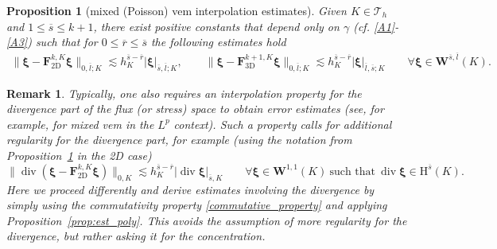 \documentclass[fleqn,a4paper]{cas-sc}
\newcommand\vdiv{\mathop{\mathrm{div}}\nolimits}
\newcommand\bdiv{\mathop{\mathbf{div}}\nolimits}
\newcommand{\bF}{\mathbf{F}}
\newcommand{\bxi}{\boldsymbol{\xi}}
\newcommand{\0}{\boldsymbol{0}}
\newcommand\cT{\mathcal{T}}
\newcommand{\bW}{\mathbf{W}}
\newcommand\rH{\mathrm{H}}
\newcommand\bH{\mathbf{H}}
\numberwithin{equation}{section}
\numberwithin{figure}{section}
\newtheorem{remark}{Remark}[section]
\newtheorem{proposition}[theorem]{Proposition}
\begin{document}
\begin{proposition}[mixed (Poisson) \gls{vem} interpolation estimates] \label{prop:est_int_mixed}
    {Given $K\in \cT_h$ 
    and $1 \leq {\overline{s}} \leq k+1$, there exist positive constants that depend} only on {$\gamma$} ({cf.} \ref{A1}-\ref{A3}) such that for $0\leq \overline{r}\leq {\overline{s}}$ the following estimates hold
    \begin{gather*}
       \|\bxi - \bF_{\mathrm{2D}}^{k,K}\bxi\|_{0,\overline{l};K} \lesssim h_K^{{\overline{s}}-\overline{r}}|\bxi|_{{\overline{s}},\overline{l};K},\qquad \|\bxi - \bF_{\mathrm{3D}}^{k+1,K}\bxi\|_{0,\overline{l};K} \lesssim h_K^{{\overline{s}}-\overline{r}}|\bxi|_{\overline{l},\overline{s};K} \qquad \forall \bxi \in \bW^{\overline{s},\overline{l}}(K).
    \end{gather*}
\end{proposition}
\begin{remark}
 Typically, one also requires an interpolation property for the divergence part of the flux (or stress) space to obtain error estimates (see, for example, \cite{gatica2021p,gharibi2025mixed,gharibi2025stabfree} for mixed \gls{vem} in the $L^p$ context). Such a property calls for additional regularity for the divergence part, for example (using the notation from Proposition~\ref{prop:est_int_mixed} in the 2D case)
\[\|\vdiv(\bxi - \bF_{\mathrm{2D}}^{k,K}\bxi)\|_{0,K} \lesssim h_K^{{\overline{s}}-\overline{r}} |\vdiv\bxi|_{\overline{s},K} \qquad \forall \bxi \in \bW^{1,1}(K) \ \text{such that} \ \vdiv\bxi \in \rH^{\overline{s}}(K).\]
Here we proceed differently and derive estimates involving the divergence by simply using the commutativity property \eqref{commutative_property} and applying Proposition~\ref{prop:est_poly}. This avoids the assumption of more regularity for the divergence, but rather asking it for the concentration. \end{remark}
\end{document}
